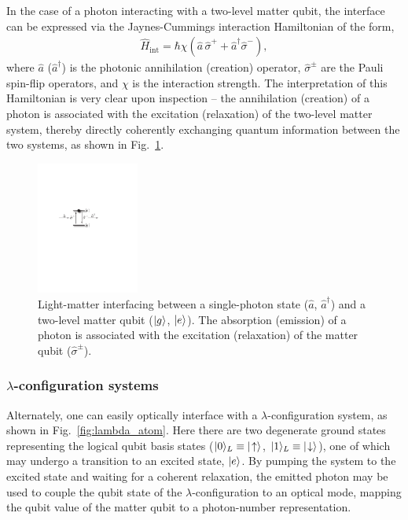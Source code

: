 In the case of a photon interacting with a two-level matter qubit, the interface can be expressed via the Jaynes-Cummings interaction Hamiltonian of the form,
\begin{align} \label{eq:two_level_hamil}
\hat{H}_\mathrm{int} = \hbar \chi (\hat{a}\,\hat\sigma^+ + \hat{a}^\dag\hat\sigma^-),
\end{align}
where $\hat{a}$ ($\hat{a}^\dag$) is the photonic annihilation (creation) operator, $\hat\sigma^\pm$ are the Pauli spin-flip operators, and $\chi$ is the interaction strength. The interpretation of this Hamiltonian is very clear upon inspection -- the annihilation (creation) of a photon is associated with the excitation (relaxation) of the two-level matter system, thereby directly coherently exchanging quantum information between the two systems, as shown in Fig.~\ref{fig:opt_int}.

\begin{figure}[!htbp]
\includegraphics[clip=true, width=0.3\textwidth]{opt_inter}
\captionspacefig \caption{Light-matter interfacing between a single-photon state ($\hat{a}$, $\hat{a}^\dag$) and a two-level matter qubit ($|g\rangle$, $|e\rangle$). The absorption (emission) of a photon is associated with the excitation (relaxation) of the matter qubit ($\hat\sigma^\pm$).} \label{fig:opt_int}
\end{figure}

%
%

\subsubsection{$\lambda$-configuration systems} 

Alternately, one can easily optically interface with a $\lambda$-configuration system, as shown in Fig.~\ref{fig:lambda_atom}. Here there are two degenerate ground states representing the logical qubit basis states (\mbox{$|0\rangle_L\equiv|\!\uparrow\rangle$}, \mbox{$|1\rangle_L\equiv|\!\downarrow\rangle$}), one of which may undergo a transition to an excited state, $|e\rangle$. By pumping the system to the excited state and waiting for a coherent relaxation, the emitted photon may be used to couple the qubit state of the $\lambda$-configuration to an optical mode, mapping the qubit value of the matter qubit to a photon-number representation.


